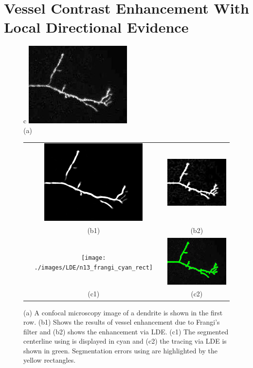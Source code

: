 \section{Vessel Contrast Enhancement With Local Directional Evidence}
\begin{figure}[t]
\centering
\begin{tabular}{c}
	\includegraphics[width=.3\textwidth]{./images/LDE/n13} \\
	\scriptsize (a) \\
\begin{tabular}{cc}
		\includegraphics[width=.3\linewidth]{./images/LDE/n13_enh_frangi} &
		\includegraphics[width=.3\linewidth]{./images/LDE/n13_enh_our} \\
		\scriptsize (b1) & 		\scriptsize (b2) \\
		\texttt{[image: ./images/LDE/n13\_frangi\_cyan\_rect]} &
		\includegraphics[width=.3\linewidth]{./images/LDE/n13_ours} \\
		\scriptsize (c1) & 		\scriptsize (c2) 
\end{tabular}
\end{tabular}
\caption{ (a) A confocal microscopy image of a dendrite is shown in the first row. (b1) Shows the results of vessel enhancement due to Frangi's filter\cite{frangi_vesselness} and (b2) shows the enhancement via LDE. (c1) The segmented centerline using \cite{frangi_vesselness} is displayed in cyan and (c2) the tracing via LDE is shown in green. Segmentation errors using \cite{frangi_vesselness} are highlighted by the yellow rectangles. }
\label{fig:demo_comp}
\end{figure}
